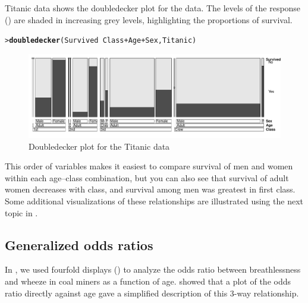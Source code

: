 \documentclass[10pt,krantz2]{krantz}\usepackage[]{graphicx}\usepackage[]{color}
\makeatletter
\newcommand{\hlopt}[1]{\textcolor[rgb]{0,0,0}{#1}}%
\newcommand{\hlstd}[1]{\textcolor[rgb]{0.345,0.345,0.345}{#1}}%
\newcommand{\hlkwd}[1]{\textcolor[rgb]{0.737,0.353,0.396}{\textbf{#1}}}%
\newenvironment{kframe}{%
 \def\at@end@of@kframe{}%
 \ifinner\ifhmode%
  \def\at@end@of@kframe{\end{minipage}}%
  \begin{minipage}{\columnwidth}%
 \fi\fi%
 \def\FrameCommand##1{\hskip\@totalleftmargin \hskip-\fboxsep
 \colorbox{shadecolor}{##1}\hskip-\fboxsep
     \hskip-\linewidth \hskip-\@totalleftmargin \hskip\columnwidth}%
 \MakeFramed {\advance\hsize-\width
   \@totalleftmargin\z@ \linewidth\hsize
   \@setminipage}}%
 {\par\unskip\endMakeFramed%
 \at@end@of@kframe}
\newenvironment{knitrout}{}{} %
\renewenvironment{knitrout}{\small\renewcommand{\baselinestretch}{.85}}{} %
\makeatother
\begin{document}
\begin{Example}{Titanic data}
 shows the doubledecker plot for the  data. The 
levels of the response () are shaded in increasing grey levels, highlighting the
proportions of survival.
\begin{knitrout}
\color{fgcolor}\begin{kframe}
\begin{alltt}
\hlstd{> }\hlkwd{doubledecker}\hlstd{(Survived} \hlopt{~} \hlstd{Class} \hlopt{+} \hlstd{Age} \hlopt{+} \hlstd{Sex, Titanic)}
\end{alltt}
\end{kframe}\begin{figure}[!htbp]

\centerline{\includegraphics[width=\textwidth]{ch05/fig/titanic-doubledecker-1} }

\caption[Doubledecker plot for the Titanic data]{Doubledecker plot for the Titanic data}\label{fig:titanic-doubledecker}
\end{figure}


\end{knitrout}
This order of variables makes it easiest to compare survival of men and women within each age--class combination,
but you can also see that survival of adult women decreases with class, and survival among men was greatest
in first class.  Some additional visualizations of these relationships are illustrated using the
next topic in .

\end{Example}

\subsection{Generalized odds ratios\hard}\label{sec:oddsratio}

In , we used fourfold displays () to analyze the odds ratio between
breathlessness and wheeze in coal miners as a function of age.  
 showed that a plot of the odds ratio directly against age
gave a simplified description of this 3-way relationship.
\end{document}
